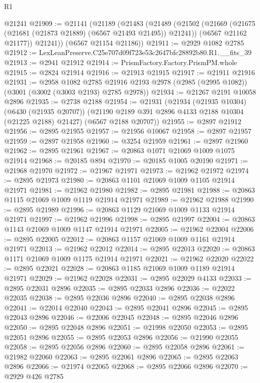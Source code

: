 \begin{lexlean}{R1}
\begin{coremodule}
    @21241
@21909 := @21141
    (@21189
      (@21483
        (@21489
          (@21502
            (@21669 (@21675 (@21681 (@21873 @21889) (@6567 @21493 @21495)) @21241))
            (@6567 @21162 @21177))
          @21241))
      (@6567 @21154 @21186))
@21911 := @2929 @1082 @2785
@21912 := LexLeanPreserve.C25e707d09f723e53c2647bfc28892b80.R1.__fits_39
@21913 := @2941 @21912
@21914 := PrismFactory.Factory.PrismPM.whole
@21915 := @2824 @21914
@21916 := @21913 @21915
@21917 := @21911 @21916
@21931 := @2958
    @1082
    @2785
    @21916
    @2193
    @2978
    (@2985 (@2995 @1082))
    (@3001 (@3002 (@3003 @2193) @2785 @2978))
@21934 := @21267 @2191 @10058 @2896
@21935 := @2738 @2188
@21954 := @21931
    (@21934
      (@21935 @10304)
      (@6430 (@21935 @20707))
      (@21190 @2189 @391 @2896 @4133 @2188 @10304 (@21225 @2188) @21427)
      (@6567 @2188 @20707))
@21955 := @2897 @21912
@21956 := @2895 @21955
@21957 := @21956 @10067
@21958 := @2897 @21957
@21959 := @2897 @21958
@21960 := @3254 @21959
@21961 := @2897 @21960
@21962 := @2895 @21961
@21967 := @20863 @1071 @21069 @1009 @1075 @21914
@21968 := @20185 @894
@21970 := @20185 @1005 @20190
@21971 := @21968 @21970
@21972 := @21967 @21971
@21973 := @21962 @21972
@21974 := @2895 @21973
@21980 := @20863 @1101 @21069 @1009 @1105 @21914 @21971
@21981 := @21962 @21980
@21982 := @2895 @21981
@21988 := @20863 @1115 @21069 @1009 @1119 @21914 @21971
@21989 := @21962 @21988
@21990 := @2895 @21989
@21996 := @20863 @1129 @21069 @1009 @1133 @21914 @21971
@21997 := @21962 @21996
@21998 := @2895 @21997
@22004 := @20863 @1143 @21069 @1009 @1147 @21914 @21971
@22005 := @21962 @22004
@22006 := @2895 @22005
@22012 := @20863 @1157 @21069 @1009 @1161 @21914 @21971
@22013 := @21962 @22012
@22014 := @2895 @22013
@22020 := @20863 @1171 @21069 @1009 @1175 @21914 @21971
@22021 := @21962 @22020
@22022 := @2895 @22021
@22028 := @20863 @1185 @21069 @1009 @1189 @21914 @21971
@22029 := @21962 @22028
@22031 := @2895 @22029 @4133
@22033 := @2895 @22031 @2896
@22035 := @2895 @22033 @2896
@22036 := @22022 @22035
@22038 := @2895 @22036 @2896
@22040 := @2895 @22038 @2896
@22041 := @22014 @22040
@22043 := @2895 @22041 @2896
@22045 := @2895 @22043 @2896
@22046 := @22006 @22045
@22048 := @2895 @22046 @2896
@22050 := @2895 @22048 @2896
@22051 := @21998 @22050
@22053 := @2895 @22051 @2896
@22055 := @2895 @22053 @2896
@22056 := @21990 @22055
@22058 := @2895 @22056 @2896
@22060 := @2895 @22058 @2896
@22061 := @21982 @22060
@22063 := @2895 @22061 @2896
@22065 := @2895 @22063 @2896
@22066 := @21974 @22065
@22068 := @2895 @22066 @2896
@22070 := @2929 @426 @2785

\end{coremodule}
\end{lexlean}
